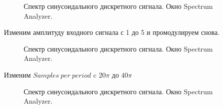 \documentclass[a4paper,14pt]{extarticle}
\begin{document}
\begin{figure}[H]
\caption{Спектр синусоидального дискретного сигнала. Окно Spectrum Analyzer.}
\label{005}
\end{figure}

\newpage

Изменим амплитуду входного сигнала с 1 до 5 и промодулируем снова.

\begin{figure}[H]
\caption{Спектр синусоидального дискретного сигнала. Окно Spectrum Analyzer.}
\label{006}
\end{figure}

Изменим $Samples \ per \ period$ c $20\pi$ до $40\pi$

\begin{figure}[H]
\caption{Спектр синусоидального дискретного сигнала. Окно Spectrum Analyzer.}
\label{007}
\end{figure}
\end{document}
